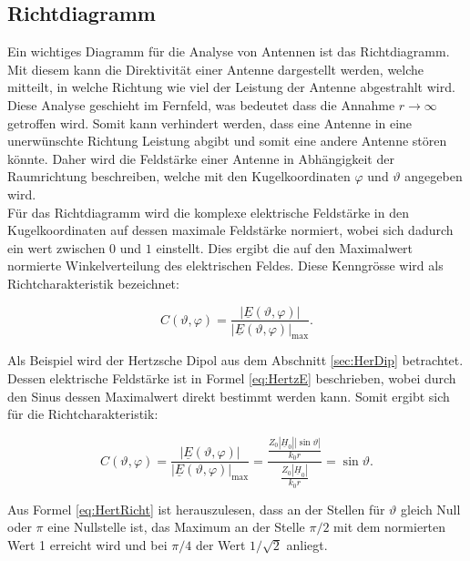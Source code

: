 \subsection{Richtdiagramm}

Ein wichtiges Diagramm für die Analyse von Antennen ist das Richtdiagramm. Mit diesem kann die Direktivität einer Antenne dargestellt werden, welche mitteilt, in welche Richtung wie viel der Leistung der Antenne abgestrahlt wird. Diese Analyse geschieht im Fernfeld, was bedeutet dass die Annahme $r \rightarrow \infty$ getroffen wird. Somit kann verhindert werden, dass eine Antenne in eine unerwünschte Richtung Leistung abgibt und somit eine andere Antenne stören könnte. Daher wird die Feldstärke einer Antenne in Abhängigkeit der Raumrichtung beschreiben, welche mit den Kugelkoordinaten $\varphi$ und $\vartheta$ angegeben wird.\\

Für das Richtdiagramm wird die komplexe elektrische Feldstärke in den Kugelkoordinaten auf dessen maximale Feldstärke normiert, wobei sich dadurch ein wert zwischen $0$ und $1$ einstellt. Dies ergibt die auf den Maximalwert normierte Winkelverteilung des elektrischen Feldes. Diese Kenngrösse wird als Richtcharakteristik bezeichnet:

\begin{equation}
C(\vartheta,\varphi) = \frac{|\underline{E}(\vartheta,\varphi)|}{|\underline{E}(\vartheta,\varphi)|_{\mathrm{max}}}.
\end{equation}

Als Beispiel wird der Hertzsche Dipol aus dem Abschnitt \ref{sec:HerDip} betrachtet. Dessen elektrische Feldstärke ist in Formel \ref{eq:HertzE} beschrieben, wobei durch den Sinus dessen Maximalwert direkt bestimmt werden kann. Somit ergibt sich für die Richtcharakteristik:

\begin{equation}\label{eq:HertRicht}
C(\vartheta,\varphi) = \frac{|\underline{E}(\vartheta,\varphi)|}{|\underline{E}(\vartheta,\varphi)|_{\mathrm{max}}} = \frac{\frac{Z_0 |\underline{H}_0| |\sin \vartheta|}{k_0r}}{\frac{Z_0 |\underline{H}_0|}{k_0r}} = \sin \vartheta.
\end{equation}

Aus Formel \ref{eq:HertRicht} ist herauszulesen, dass an der Stellen für $\vartheta$ gleich Null oder $\pi$ eine Nullstelle ist, das Maximum an der Stelle $\pi/2$ mit dem normierten Wert 1 erreicht wird und bei $\pi/4$ der Wert $1/\sqrt{2}$ anliegt.\\

